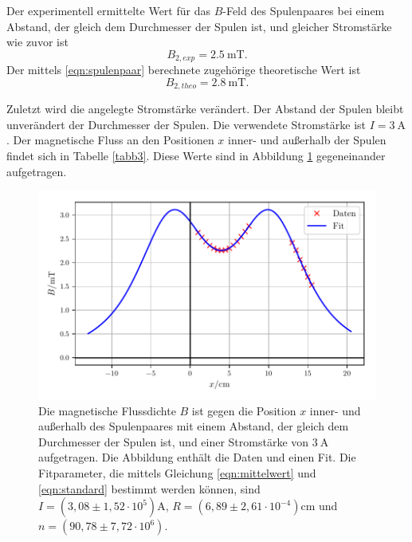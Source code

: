 \noindent Der experimentell ermittelte Wert für das $B$-Feld
des Spulenpaares bei einem Abstand, der gleich dem Durchmesser
der Spulen ist, und gleicher Stromstärke wie zuvor ist 
\begin{equation*}
   B_{2,exp} = \SI{2.5}{\milli\tesla}.
\end{equation*}
Der mittels \eqref{eqn:spulenpaar} berechnete zugehörige theoretische Wert
ist 
\begin{equation*}
   B_{2,theo} = \SI{2.8}{\milli\tesla}.
\end{equation*}

\noindent Zuletzt wird die angelegte Stromstärke verändert. Der Abstand
der Spulen bleibt unverändert der Durchmesser der Spulen.
Die verwendete Stromstärke ist $I = \SI{3}{\ampere}$.
Der magnetische Fluss an den Positionen $x$ inner- und außerhalb
der Spulen findet sich in Tabelle \ref{tabb3}.
Diese Werte sind in Abbildung \ref{plotb3} gegeneinander
aufgetragen.


\begin{figure}
    \centering
    \includegraphics{build/plotb3.pdf}
    \caption{Die magnetische Flussdichte $B$ ist gegen die Position $x$ inner-
    und außerhalb des Spulenpaares mit einem Abstand, der gleich dem Durchmesser
    der Spulen ist, und einer Stromstärke von $\SI{3}{\ampere}$ aufgetragen.
    Die Abbildung enthält die Daten und einen Fit.
    Die Fitparameter, die mittels Gleichung \eqref{eqn:mittelwert} und \eqref{eqn:standard}
    bestimmt werden können, sind $I = (3,08 \pm 1,52 \cdot 10^5) \si{\ampere}$,
    $R = (6,89 \pm 2,61 \cdot 10^{-4}) \si{\centi\meter}$ und $n = (90,78 \pm 7,72 \cdot 10^6)$.}
    \label{plotb3}
\end{figure}

